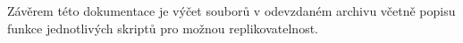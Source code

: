 \documentclass[11pt, a4paper]{article}
\theoremstyle{definition}
\begin{document}
Závěrem této dokumentace je výčet souborů v odevzdaném archivu včetně popisu funkce jednotlivých skriptů pro možnou replikovatelnost.


\end{document}
